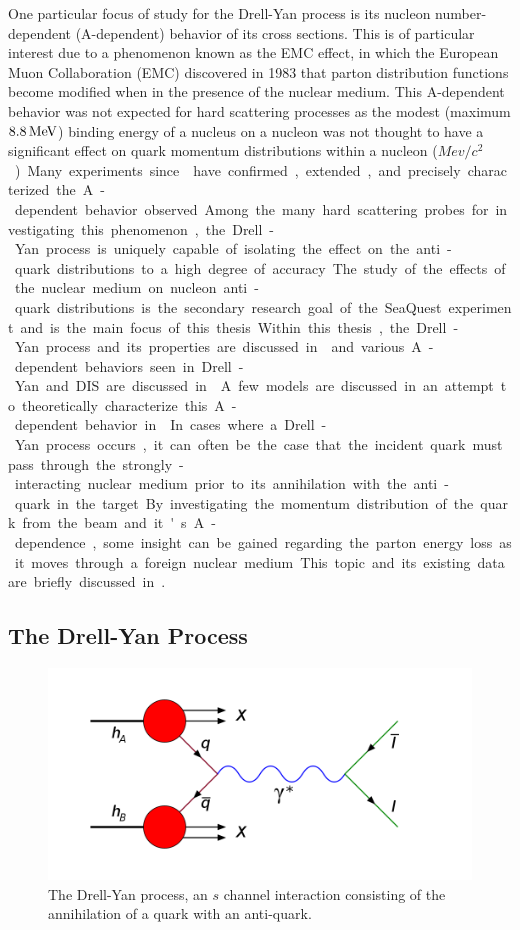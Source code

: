 One particular focus of study for the Drell-Yan process is its nucleon number-dependent (A-dependent) behavior of its cross sections. This is of particular interest due to a phenomenon known as the EMC effect, in which the European Muon Collaboration (EMC) discovered in 1983 that parton distribution functions become modified when in the presence of the nuclear medium. This A-dependent behavior was not expected for hard scattering processes as the modest (maximum $\unit[8.8]{MeV}$) binding energy of a nucleus on a nucleon was not thought to have a significant effect on quark momentum distributions within a nucleon (\unit[938]{$Mev/c^2$}). Many experiments since\CN have confirmed, extended, and precisely characterized the A-dependent behavior observed. Among the many hard scattering probes for investigating this phenomenon, the Drell-Yan process is uniquely capable of isolating the effect on the anti-quark distributions to a high degree of accuracy. The study of the effects of the nuclear medium on nucleon anti-quark distributions is the secondary research goal of the SeaQuest experiment and is the main focus of this thesis.

Within this thesis, the Drell-Yan process and its properties are discussed in  and various A-dependent behaviors seen in Drell-Yan and DIS are discussed in . A few models are discussed in an attempt to theoretically characterize this A-dependent behavior in .

In cases where a Drell-Yan process occurs, it can often be the case that the incident quark must pass through the strongly-interacting nuclear medium prior to its annihilation with the anti-quark in the target. By investigating the momentum distribution of the quark from the beam and it's A-dependence, some insight can be gained regarding the parton energy loss as it moves through a foreign nuclear medium. This topic and its existing data are briefly discussed in .

\subsection{The Drell-Yan Process}

\begin{figure}[h]
	\centering
	\includegraphics[width=4.5in]{figures/background/Drell-Yan.png}
	\caption{The Drell-Yan process, an $s$ channel interaction consisting of the annihilation of a quark with an anti-quark.}
	\label{fig:dy-diagram}
\end{figure}

